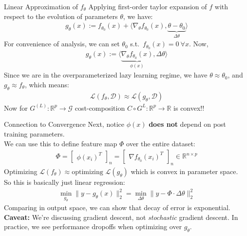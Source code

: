\documentclass{beamer}
\begin{document}
\begin{frame}{Linear Approximation of $f_\theta$}
	Applying first-order taylor expansion of $f$ with respect to the evolution of parameters $\theta$, we have:
	\begin{gather}
		g_\theta (x) := f_{\theta_0}(x) + \langle \nabla_\theta f_{\theta_0}(x), \underbrace{\theta - \theta_0}_{\Delta \theta} \rangle
	\end{gather} \pause
	For convenience of analysis, we can set $\theta_0$ s.t.~$f_{\theta_0}(x) = 0~\forall x$. \pause Now,
	\begin{gather}
		g_\theta (x) := \langle \underbrace{\nabla_\theta f_{\theta_0}(x)}_{\phi(x)}, \Delta \theta  \rangle
	\end{gather} \pause
	Since we are in the overparameterized lazy learning regime, we have $\theta \approx \theta_0$, and $g_\theta \approx f_\theta$, which means:
	\begin{gather}
		\mathcal{L}(f_\theta, \mathcal{D}) \approx \mathcal{L}(g_\theta, \mathcal{D})
	\end{gather} \pause
	Now for $G^{(L)}: \mathbb{R}^p \rightarrow \mathcal{G}$ cost-composition $C \circ G^{L}: \mathbb{R}^p \rightarrow \mathbb{R}$ is convex!!
\end{frame}

\begin{frame}{Connection to Convergence}
	Next, notice $\phi(x)$ \textbf{does not} depend on post training parameters. \pause \newline \\

	We can use this to define feature map $\Phi$ over the entire dataset:
	\begin{gather}
		\Phi =
		\begin{bmatrix}
			\phi(x_i)^T
		\end{bmatrix}_n =
		\begin{bmatrix}
			\nabla f_{\theta_0}(x_i)^T
		\end{bmatrix}_n \in \mathbb{R}^{n \times p}
	\end{gather} \pause
	Optimizing $\mathcal{L}(f_\theta) \approx \text{optimizing } \mathcal{L}(g_\theta)$ which is convex in parameter space. \\
	So this is basically just linear regression:
	\begin{gather}
		\min_{g_\theta} \| y - g_\theta(x) \|^2_2 = 
		\min_{\Delta \theta} \|  y - \Phi \cdot \Delta \theta \|^2_2
	\end{gather}
	Comparing in output space, we can show that decay of error is exponential. \pause \newline \\
	
	\textbf{Caveat:} We're discussing gradient descent, not \textit{stochastic} gradient descent. In practice, we see performance dropoffs when optimizing over $g_\theta$.
\end{frame}
\end{document}
